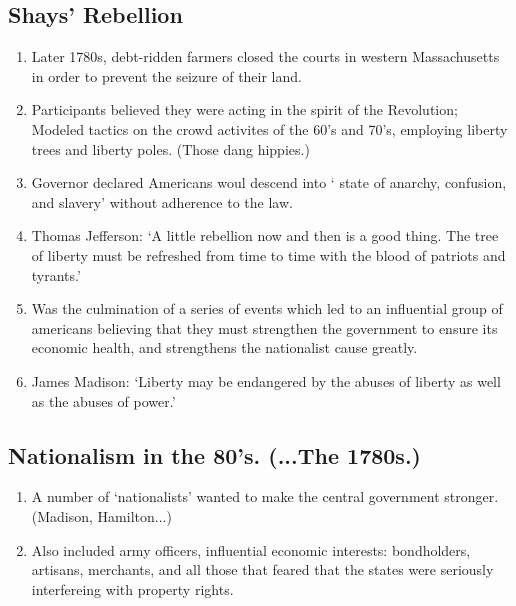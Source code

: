 \documentclass{article}
\begin{document}
    \subsection{Shays' Rebellion}
    \begin{enumerate}
      \item Later 1780s, debt-ridden farmers closed the courts in western Massachusetts in order to prevent the seizure of their land.
      \item Participants believed they were acting in the spirit of the Revolution; Modeled tactics on the crowd activites of the 60's and 70's, employing liberty trees and liberty poles. (Those dang hippies.)
      \item Governor declared Americans woul descend into ` state of anarchy, confusion, and slavery' without adherence to the law.
      \item Thomas Jefferson: `A little rebellion now and then is a good thing. The tree of liberty must be refreshed from time to time with the blood of patriots and tyrants.'
      \item Was the culmination of a series of events which led to an influential group of americans believing that they must strengthen the government to ensure its economic health, and strengthens the nationalist cause greatly.
      \item James Madison: `Liberty may be endangered by the abuses of liberty as well as the abuses of power.'
    \end{enumerate}

    \subsection{Nationalism in the 80's. (...The 1780s.)}
    \begin{enumerate}
      \item A number of `nationalists' wanted to make the central government stronger. (Madison, Hamilton...)
      \item Also included army officers, influential economic interests: bondholders, artisans, merchants, and all those that feared that the states were seriously interfereing with property rights.
    \end{enumerate}
\end{document}
